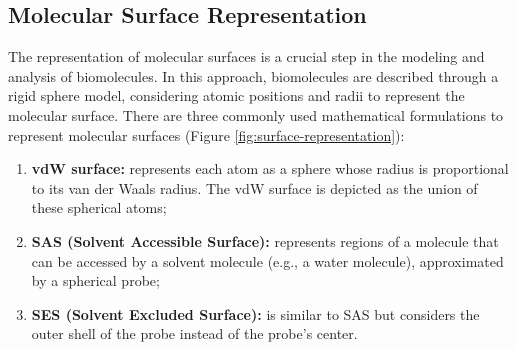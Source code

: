 \documentclass[Ingles]{phdthesis}
\begin{document}


\subsection{Molecular Surface Representation}

The representation of molecular surfaces is a crucial step in the modeling and analysis of biomolecules. In this approach, biomolecules are described through a rigid sphere model, considering atomic positions and radii to represent the molecular surface. There are three commonly used mathematical formulations to represent molecular surfaces (Figure \ref{fig:surface-representation}):

\begin{enumerate}[label=\textbf{(\Alph*)}]
  \item \textbf{vdW surface:} represents each atom as a sphere whose radius is proportional to its van der Waals radius. The vdW surface is depicted as the union of these spherical atoms;
  \item \textbf{SAS (Solvent Accessible Surface):} represents regions of a molecule that can be accessed by a solvent molecule (e.g., a water molecule), approximated by a spherical probe;
  \item \textbf{SES (Solvent Excluded Surface):} is similar to SAS but considers the outer shell of the probe instead of the probe's center.
\end{enumerate}
  
\end{document}
